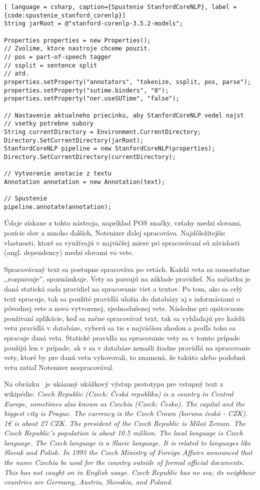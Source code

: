 \begin{lstlisting}[ language = csharp, caption={Spustenie StanfordCoreNLP}, label = {code:spustenie_stanford_corenlp}]
String jarRoot = @"stanford-corenlp-3.5.2-models";

Properties properties = new Properties();
// Zvolime, ktore nastroje chceme pouzit.
// pos = part-of-speech tagger
// ssplit = sentence split
// atd.
properties.setProperty("annotators", "tokenize, ssplit, pos, parse");
properties.setProperty("sutime.binders", "0");
properties.setProperty("ner.useSUTime", "false");

// Nastavenie aktualneho priecinku, aby StanfordCoreNLP vedel najst
// vsetky potrebne subory
String currentDirectory = Environment.CurrentDirectory;
Directory.SetCurrentDirectory(jarRoot);
StanfordCoreNLP pipeline = new StanfordCoreNLP(properties);
Directory.SetCurrentDirectory(currentDirectory);

// Vytvorenie anotacie z textu
Annotation annotation = new Annotation(text);

// Spustenie
pipeline.annotate(annotation);
\end{lstlisting}

Údaje získane z tohto nástroja, napríklad POS značky, vzťahy medzi slovami, pozície slov a mnoho ďalších, Notenizer ďalej spracováva. Najdôležitejšie vlastnosti, ktoré sa využívajú v najväčšej miere pri spracovávaní sú závislosti (angl. dependency) medzi slovami vo vete.  

Spracovávaný text sa postupne spracováva po vetách. Každá veta sa samostatne ,,rozparsuje'', spoznámkuje. Vety sa parsujú na základe pravidiel. Na začiatku je daná statická sada pravidiel na spracovanie viet a textov. Po tom, ako sa celý text spracuje, tak sa použité pravidlá uložia do databázy aj s informáciami o pôvodnej vete a novo vytvorenej, zjednodušenej vete. Následne pri opätovnom používaní aplikácie, keď sa začne spracovávať text, tak sa vyhľadajú pre každú vetu pravidlá v databáze, vyberú sa tie s najväčšou zhodou a podľa toho sa spracuje daná veta. Statické pravidla na spracovanie vety sa v tomto prípade použijú len v prípade, ak v sa v databáze nenašli žiadne pravidlá na spracovanie vety, ktoré by pre danú vetu vyhovovali, to znamená, že takúto alebo podobnú vetu zatiaľ Notenizer nespracovával.

Na obrázku~ je ukázaný ukážkový výstup prototypu pre vstupný text z wikipédie:
\textit{Czech Republic (Czech: Česká republika) is a country in Central Europe, sometimes also known as Czechia (Czech: Česko). The capital and the biggest city is Prague. The currency is the Czech Crown (koruna česká - CZK). 1€ is about 27 CZK. The president of the Czech Republic is Miloš Zeman. The Czech Republic's population is about 10.5 million. The local language is Czech language. The Czech language is a Slavic language. It is related to languages like Slovak and Polish. In 1993 the Czech Ministry of Foreign Affairs announced that the name Czechia be used for the country outside of formal official documents. This has not caught on in English usage. Czech Republic has no sea; its neighbour countries are Germany, Austria, Slovakia, and Poland.}
\\


